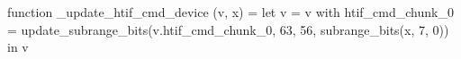function _update_htif_cmd_device (v, x) = let v = { v with htif_cmd_chunk_0 = update_subrange_bits(v.htif_cmd_chunk_0, 63, 56, subrange_bits(x, 7, 0)) } in
  v
